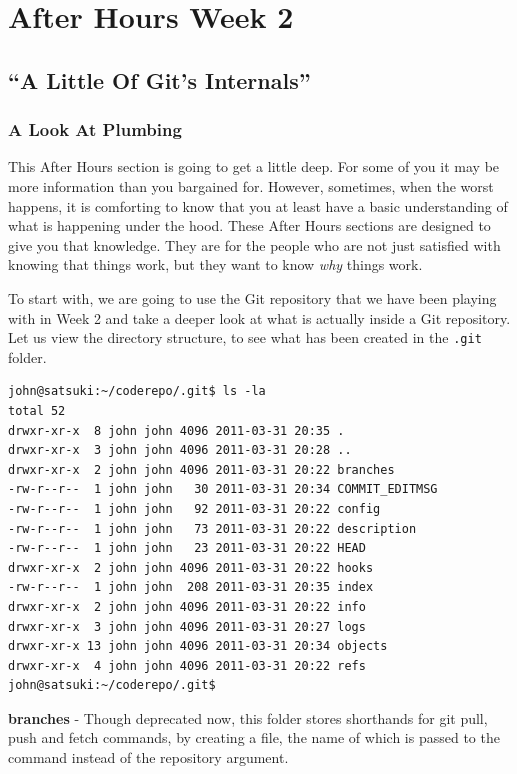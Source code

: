\chapter{After Hours Week 2}
\section{``A Little Of Git's Internals''}
\subsection{A Look At Plumbing}
This After Hours section is going to get a little deep.
For some of you it may be more information than you bargained for.
However, sometimes, when the worst happens, it is comforting to know that you at least have a basic understanding of what is happening under the hood.
These After Hours sections are designed to give you that knowledge.
They are for the people who are not just satisfied with knowing that things work, but they want to know \emph{why} things work.

To start with, we are going to use the Git repository that we have been playing with in Week 2 and take a deeper look at what is actually inside a Git repository.
Let us view the directory structure, to see what has been created in the \texttt{.git} folder.

\begin{Verbatim}
john@satsuki:~/coderepo/.git$ ls -la
total 52
drwxr-xr-x  8 john john 4096 2011-03-31 20:35 .
drwxr-xr-x  3 john john 4096 2011-03-31 20:28 ..
drwxr-xr-x  2 john john 4096 2011-03-31 20:22 branches
-rw-r--r--  1 john john   30 2011-03-31 20:34 COMMIT_EDITMSG
-rw-r--r--  1 john john   92 2011-03-31 20:22 config
-rw-r--r--  1 john john   73 2011-03-31 20:22 description
-rw-r--r--  1 john john   23 2011-03-31 20:22 HEAD
drwxr-xr-x  2 john john 4096 2011-03-31 20:22 hooks
-rw-r--r--  1 john john  208 2011-03-31 20:35 index
drwxr-xr-x  2 john john 4096 2011-03-31 20:22 info
drwxr-xr-x  3 john john 4096 2011-03-31 20:27 logs
drwxr-xr-x 13 john john 4096 2011-03-31 20:34 objects
drwxr-xr-x  4 john john 4096 2011-03-31 20:22 refs
john@satsuki:~/coderepo/.git$
\end{Verbatim}

\textbf{branches} - Though deprecated now, this folder stores shorthands for git pull, push and fetch commands, by creating a file, the name of which is passed to the command instead of the repository argument.

